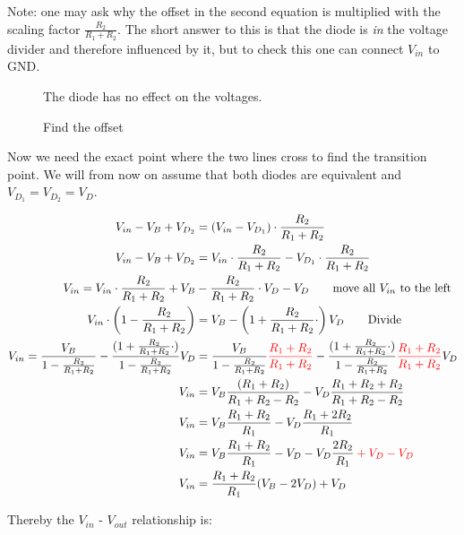 \documentclass[11ypt]{extarticle}
\begin{document}
Note: one may ask why the offset in the second equation is multiplied with the scaling factor $\frac{R_2}{R_1 + R_2}$. The short answer to this is that the diode is \textit{in} the voltage divider and therefore influenced by it, but to check this one can connect $V_{in}$ to GND. 

\begin{figure}[H]{} 
    \centering
    
    \caption{Find the offset}
    The diode has no effect on the voltages.
\end{figure}
 
Now we need the exact point where the two lines cross to find the transition point. We will from now on assume that both diodes are equivalent and $V_{D_1}= V_{D_2} = V_D$.

\begin{equation}
\begin{aligned}
	V_{in} - V_B + V_{D_2} &= (V_{in} - V_{D_1}) \cdot \frac{R_2}{R_1 + R_2} 
	\\
	V_{in} - V_B + V_{D_2} &= V_{in} \cdot \frac{R_2}{R_1 + R_2} - V_{D_1} \cdot \frac{R_2}{R_1 + R_2}
	\\
	V_{in} = V_{in} \cdot \frac{R_2}{R_1 + R_2} + V_B & - \frac{R_2}{R_1 + R_2}\cdot V_D - V_D \qquad \text{move all $V_{in}$ to the left}
	\\
	V_{in} \cdot \left( 1 - \frac{R_2}{R_1 + R_2} \right) &= V_B - \left( 1 + \frac{R_2}{R_1 + R_2} \cdot \right) V_D \qquad \text{Divide}
	\\
	V_{in} = \frac{V_B}{1 - \frac{R_2}{R_1 + R_2}} - \frac{( 1 + \frac{R_2}{R_1 + R_2} \cdot )}{1 - \frac{R_2}{R_1 + R_2}} V_D &= \frac{V_B}{1 - \frac{R_2}{R_1 + R_2}}\mathcolor{red}{ \frac{R_1 + R_2}{R_1 + R_2}} - \frac{( 1 + \frac{R_2}{R_1 + R_2} \cdot )}{1 - \frac{R_2}{R_1 + R_2}} \mathcolor{red}{ \frac{R_1 + R_2}{R_1 + R_2}} V_D
	\\
	V_{in} &= V_B \frac{(R_1 + R_2)}{R_1 + R_2 - R_2} - V_D \frac{R_1 + R_2 + R_2}{R_1 + R_2 - R_2}
	\\
	V_{in} &= V_B \frac{R_1 + R_2}{R_1} - V_D \frac{R_1 + 2R_2}{R_1}
	\\
	V_{in} &= V_B \frac{R_1 + R_2}{R_1} - V_D - V_D\frac{2 R_2}{R_1} \mathcolor{red}{+ V_D - V_D}
	\\
	V_{in} &= \frac{R_1 + R_2}{R_1}(V_B - 2V_D) + V_D
\end{aligned}
\end{equation}

Thereby the $V_{in}$ - $V_{out}$ relationship is:
\end{document}
